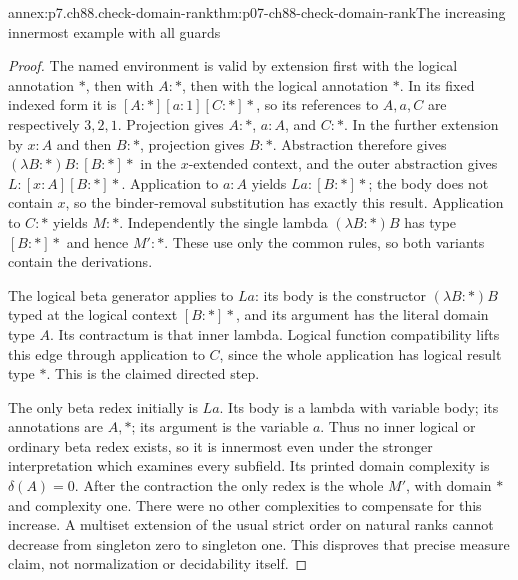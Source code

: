 \begin{annexitem}{annex:p7.ch88.check-domain-rank}{thm:p07-ch88-check-domain-rank}{The increasing innermost example with all guards}
\begin{proof}
The named environment is valid by extension first with the logical
annotation \(\ast\), then with \(A:\ast\), then with the logical
annotation \(\ast\). In its fixed indexed form it is
\([A:\ast][a:1][C:\ast]\ast\), so its references to \(A,a,C\)
are respectively \(3,2,1\). Projection gives \(A:\ast\),
\(a:A\), and \(C:\ast\). In the further extension by \(x:A\)
and then \(B:\ast\), projection gives \(B:\ast\). Abstraction
therefore gives \((\lambda B:\ast)B:[B:\ast]\ast\) in the
\(x\)-extended context, and the outer abstraction gives
\(L:[x:A][B:\ast]\ast\). Application to \(a:A\) yields
\(La:[B:\ast]\ast\); the body does not contain \(x\), so the
binder-removal substitution has exactly this result. Application to
\(C:\ast\) yields \(M:\ast\). Independently the single lambda
\((\lambda B:\ast)B\) has type \([B:\ast]\ast\) and hence
\(M':\ast\). These use only the common rules, so both variants
contain the derivations.

The logical beta generator applies to \(La\): its body is the
constructor \((\lambda B:\ast)B\) typed at the logical context
\([B:\ast]\ast\), and its argument has the literal domain type
\(A\). Its contractum is that inner lambda. Logical function
compatibility lifts this edge through application to \(C\), since
the whole application has logical result type \(\ast\). This is
the claimed directed step.

The only beta redex initially is \(La\). Its body is a lambda with
variable body; its annotations are \(A,\ast\); its argument is the
variable \(a\). Thus no inner logical or ordinary beta redex exists,
so it is innermost even under the stronger interpretation which
examines every subfield. Its printed domain complexity is
\(\delta(A)=0\). After the contraction the only redex is the whole
\(M'\), with domain \(\ast\) and complexity one. There were no
other complexities to compensate for this increase. A multiset
extension of the usual strict order on natural ranks cannot decrease
from singleton zero to singleton one. This disproves that precise
measure claim, not normalization or decidability itself.
\end{proof}
\end{annexitem}

